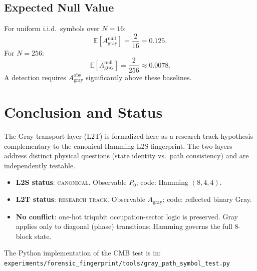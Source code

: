 \documentclass[11pt]{article}
\begin{document}
\subsection{Expected Null Value}

For uniform i.i.d.\ symbols over $N=16$:
\[
  \mathbb{E}[A_{\mathrm{gray}}^{\mathrm{null}}] = \frac{2}{16} = 0.125.
\]
For $N=256$:
\[
  \mathbb{E}[A_{\mathrm{gray}}^{\mathrm{null}}] = \frac{2}{256} \approx 0.0078.
\]
A detection requires $A_{\mathrm{gray}}^{\mathrm{obs}}$ significantly above
these baselines.

\section{Conclusion and Status}

The Gray transport layer (L2T) is formalized here as a research-track hypothesis
complementary to the canonical Hamming L2S fingerprint. The two layers address
distinct physical questions (state identity vs.\ path consistency) and are
independently testable.

\begin{itemize}
\item \textbf{L2S status}: \textsc{canonical}.
  Observable $P_0$; code: Hamming $(8,4,4)$.
\item \textbf{L2T status}: \textsc{research track}.
  Observable $A_{\mathrm{gray}}$; code: reflected binary Gray.
\item \textbf{No conflict}: one-hot triqubit occupation-sector logic is preserved.
  Gray applies only to diagonal (phase) transitions; Hamming governs the
  full 8-block state.
\end{itemize}

The Python implementation of the CMB test is in:\\
\texttt{experiments/forensic\_fingerprint/tools/gray\_path\_symbol\_test.py}
\end{document}
